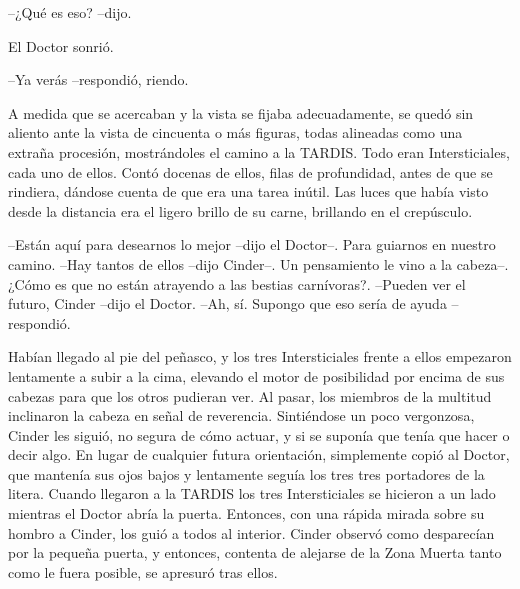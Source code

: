 --¿Qué es eso? --dijo.

El Doctor sonrió. 

--Ya verás --respondió, riendo.

A medida que se acercaban y la vista se fijaba adecuadamente, se quedó sin aliento ante la vista de cincuenta o más figuras, todas alineadas como una extraña procesión, mostrándoles el camino a la TARDIS. Todo eran Intersticiales, cada uno de ellos. Contó docenas de ellos, filas de profundidad, antes de que se rindiera, dándose cuenta de que era una tarea inútil.
Las luces que había visto desde la distancia era el ligero brillo de su carne, brillando en el crepúsculo.

--Están aquí para desearnos lo mejor --dijo el Doctor--. Para guiarnos en nuestro camino.
--Hay tantos de ellos --dijo Cinder--. Un pensamiento le vino a la cabeza--. ¿Cómo es que no están atrayendo a las bestias carnívoras?.
--Pueden ver el futuro, Cinder --dijo el Doctor.
--Ah, sí. Supongo que eso sería de ayuda --respondió.

Habían llegado al pie del peñasco, y los tres Intersticiales frente a ellos empezaron lentamente a subir a la cima, elevando el motor de posibilidad por encima de sus cabezas para que los otros pudieran ver. Al pasar, los miembros de la multitud inclinaron la cabeza en señal de reverencia.
Sintiéndose un poco vergonzosa, Cinder les siguió, no segura de cómo actuar, y si se suponía que tenía que hacer o decir algo. En lugar de cualquier futura orientación, simplemente copió al Doctor, que mantenía sus ojos bajos y lentamente seguía los tres tres portadores de la litera.
Cuando llegaron a la TARDIS los tres Intersticiales se hicieron a un lado mientras el Doctor abría la puerta. Entonces, con una rápida mirada sobre su hombro a Cinder, los guió a todos al interior.
Cinder observó como desparecían por la pequeña puerta, y entonces, contenta de alejarse de la Zona Muerta tanto como le fuera posible, se apresuró tras ellos.

